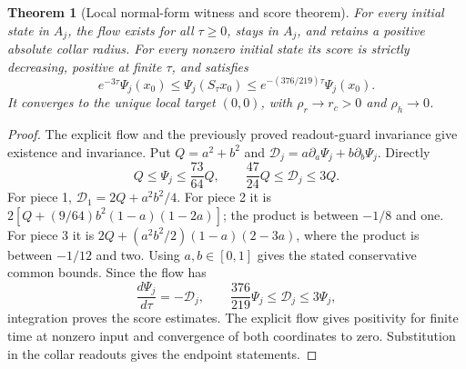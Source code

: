 \documentclass[11pt,a4paper]{article}
\newtheorem{theorem}{Theorem}
\begin{document}
\begin{theorem}[Local normal-form witness and score theorem]
\label{thm:local-normal-form-flow}
For every initial state in $A_j$, the flow exists for all $\tau\ge0$, stays
in $A_j$, and retains a positive absolute collar radius.
For every nonzero initial state its score is strictly decreasing, positive
at finite $\tau$, and satisfies
\[
e^{-3\tau}\Psi_j(x_0)
\le\Psi_j(S_\tau x_0)
\le e^{-(376/219)\tau}\Psi_j(x_0).
\]
It converges to the unique local target $(0,0)$, with
$\rho_r\to r_c>0$ and $\rho_h\to0$.
\end{theorem}
\begin{proof}
The explicit flow and the previously proved readout-guard invariance give
existence and invariance. Put $Q=a^2+b^2$ and
$\mathcal D_j=a\partial_a\Psi_j+b\partial_b\Psi_j$. Directly
\[
Q\le\Psi_j\le\frac{73}{64}Q,\qquad
\frac{47}{24}Q\le\mathcal D_j\le3Q.
\]
For piece 1, $\mathcal D_1=2Q+a^2b^2/4$.
For piece 2 it is
$2[Q+(9/64)b^2(1-a)(1-2a)]$; the product is between $-1/8$ and one.
For piece 3 it is
$2Q+(a^2b^2/2)(1-a)(2-3a)$, where the product is between $-1/12$ and two.
Using $a,b\in[0,1]$ gives the stated conservative common bounds.
Since the flow has
\[
\frac{d\Psi_j}{d\tau}=-\mathcal D_j,
\qquad \frac{376}{219}\Psi_j\le\mathcal D_j\le3\Psi_j,
\]
integration proves the score estimates. The explicit flow gives positivity
for finite time at nonzero input and convergence of both coordinates to
zero. Substitution in the collar readouts gives the endpoint statements.
\end{proof}
\end{document}
